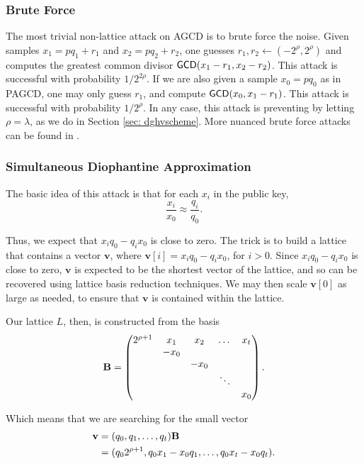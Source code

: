     \subsubsection{Brute Force}

    The most trivial non-lattice attack on AGCD is to brute force the noise. Given samples $x_1 = pq_1 + r_1$ and $x_2 = pq_2 + r_2$, one guesses $r_1, r_2 \leftarrow (-2^\rho, 2^\rho)$ and computes the greatest common divisor ${\sf GCD}(x_1 - r_1, x_2 - r_2)$. This attack is successful with probability $1/2^{2\rho}$. If we are also given a sample $x_0 = pq_0$ as in PAGCD, one may only guess $r_1$, and compute ${\sf GCD}(x_0, x_1 - r_1)$. This attack is successful with probability $1/2^\rho$. In any case, this attack is preventing by letting $\rho = \lambda$, as we do in Section \ref{sec: dghvscheme}. More nuanced brute force attacks can be found in \cite{dghv}.



    \subsubsection{Simultaneous Diophantine Approximation}
    The basic idea of this attack is that for each $x_i$ in the public key,
    \[\frac{x_i}{x_0} \approx \frac{q_i}{q_0}.\]

    Thus, we expect that $x_i q_0 - q_i x_0$ is close to zero. The trick is to build a lattice that contains a vector $\mathbf{v}$, where $\mathbf{v}[i] = x_i q_0 - q_i x_0$, for $i > 0$. Since $x_i q_0 - q_i x_0$ is close to zero, $\mathbf{v}$ is expected to be the shortest vector of the lattice, and so can be recovered using lattice basis reduction techniques. We may then scale $\mathbf{v}[0]$ as large as needed, to ensure that $\mathbf{v}$ is contained within the lattice.

    Our lattice $L$, then, is constructed from the basis
    \[\textbf{B} = \begin{pmatrix}
    2^{\rho + 1} & x_1 & x_2 & \dots & x_t\\
    & -x_0 & \\
    & & -x_0 \\
    & & & \ddots \\
    & & & & x_0
\end{pmatrix}. \]

    Which means that we are searching for the small vector
    \begin{align*}
    \mathbf{v} &= (q_0, q_1, \dots, q_t) \textbf{B} \\
    &= (q_0 2^{\rho + 1}, q_0 x_1 - x_0 q_1, \dots, q_0 x_t - x_0 q_t).
    \end{align*}

